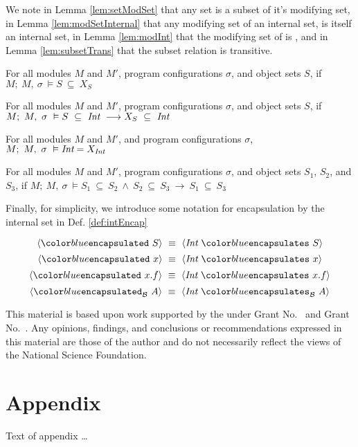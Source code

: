 \documentclass[acmsmall,review,anonymous]{acmart}\settopmatter{printfolios=true,printccs=false,printacmref=false}
\begin{document}
We note in Lemma \ref{lem:setModSet} that any set is a 
subset of it's modifying set, in Lemma \ref{lem:modSetInternal} that 
any modifying set of an internal set, is itself an internal set, 
in Lemma \ref{lem:modInt} that the modifying set of \I is \I,
and in Lemma \ref{lem:subsetTrans} that the subset relation is transitive.
\begin{lemma}
\label{lem:setModSet}
For all modules $M$ and $M'$, program configurations $\sigma$, and object sets $S$, 
if $M;\ M,\ \sigma\ \vDash S\ \subseteq\ X_S$
\end{lemma}
\begin{lemma}
\label{lem:modSetInternal}
For all modules $M$ and $M'$, program configurations $\sigma$, and object sets $S$, 
if $M;\ M,\ \sigma\ \vDash S\ \subseteq\ \I\ \longrightarrow X_S\ \subseteq\ \I$
\end{lemma}
\begin{lemma}[\I = $X_{\I}$]
\label{lem:modInt}
For all modules $M$ and $M'$, and program configurations $\sigma$, 
$M;\ M,\ \sigma\ \vDash \textit{Int} = X_{\textit{Int}}$
\end{lemma}
\begin{lemma}
\label{lem:subsetTrans}
For all modules $M$ and $M'$, program configurations $\sigma$, and object sets $S_1$, $S_2$, 
and $S_3$, if $M;\ M,\ \sigma\ \vDash S_1\ \subseteq\ S_2\ \wedge\ S_2\ \subseteq\ S_3\ \longrightarrow\ S_1\ \subseteq\ S_3$
\end{lemma}

Finally, for simplicity, we introduce some notation for encapsulation by the 
internal set in Def. \ref{def:intEncap}
\begin{definition}
\label{def:intEncap}
$$\encapsulated{S}\ \equiv\ \encapsulates{\I}{S}$$
$$\encapsulated{x}\ \equiv\ \encapsulates{\I}{x}$$
$$\encapsulated{x.f}\ \equiv\ \encapsulates{\I}{x.f}$$
$$\bencapsulated{A}\ \equiv\ \bencapsulates{\I}{A}$$
\end{definition}


\begin{acks}                            %
  This material is based upon work supported by the
   under Grant
  No.~ and Grant
  No.~.  Any opinions, findings, and
  conclusions or recommendations expressed in this material are those
  of the author and do not necessarily reflect the views of the
  National Science Foundation.
\end{acks}





\appendix
\section{Appendix}

Text of appendix \ldots
\end{document}
